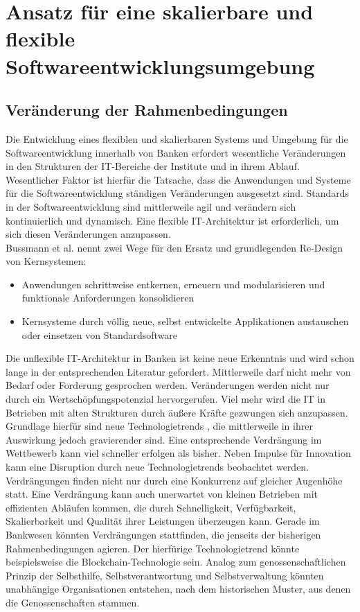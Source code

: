 \chapter{Ansatz für eine skalierbare und flexible Softwareentwicklungsumgebung}
\label{ch:chapter04}

\section{Veränderung der Rahmenbedingungen}

Die Entwicklung eines flexiblen und skalierbaren Systems und Umgebung für die Softwareentwicklung innerhalb von Banken erfordert wesentliche Veränderungen in den Strukturen der IT-Bereiche der Institute und in ihrem Ablauf. Wesentlicher Faktor ist hierfür die Tatsache, dass die Anwendungen und Systeme für die Softwareentwicklung ständigen Veränderungen ausgesetzt sind. Standards in der Softwareentwicklung sind mittlerweile agil und verändern sich kontinuierlich und dynamisch. Eine flexible IT-Architektur ist erforderlich, um sich diesen Veränderungen anzupassen.
\medskip
\\
Bussmann et al. nennt zwei Wege für den Ersatz und grundlegenden Re-Design von Kernsystemen: \cite{Bussmann2006}
\begin{itemize}
    \item Anwendungen schrittweise entkernen, erneuern und modularisieren und funktionale Anforderungen konsolidieren
    \item Kernsysteme durch völlig neue, selbst entwickelte Applikationen austauschen oder einsetzen von Standardsoftware
\end{itemize}
%
Die unflexible IT-Architektur in Banken ist keine neue Erkenntnis und wird schon lange in der entsprechenden Literatur gefordert. Mittlerweile darf nicht mehr von Bedarf oder Forderung gesprochen werden. Veränderungen werden nicht nur durch ein Wertschöpfungspotenzial hervorgerufen. Viel mehr wird die IT in Betrieben mit alten Strukturen durch äußere Kräfte gezwungen sich anzupassen. Grundlage hierfür sind neue Technologietrends \cite{Bussmann2006}, die mittlerweile in ihrer Auswirkung jedoch gravierender sind. Eine entsprechende Verdrängung im Wettbewerb kann viel schneller erfolgen als bisher. Neben Impulse für Innovation kann eine Disruption durch neue Technologietrends beobachtet werden.
\medskip
\\
Verdrängungen finden nicht nur durch eine Konkurrenz auf gleicher Augenhöhe statt. Eine Verdrängung kann auch unerwartet von kleinen Betrieben mit effizienten Abläufen kommen, die durch Schnelligkeit, Verfügbarkeit, Skalierbarkeit und Qualität ihrer Leistungen überzeugen kann.  Gerade im Bankwesen könnten Verdrängungen stattfinden, die jenseits der bisherigen Rahmenbedingungen agieren. Der hierfürige Technologietrend könnte beispielsweise die Blockchain-Technologie sein. Analog zum genossenschaftlichen Prinzip der Selbsthilfe, Selbstverantwortung und Selbstverwaltung könnten unabhängige Organisationen entstehen, nach dem historischen Muster, aus denen die Genossenschaften stammen. 

